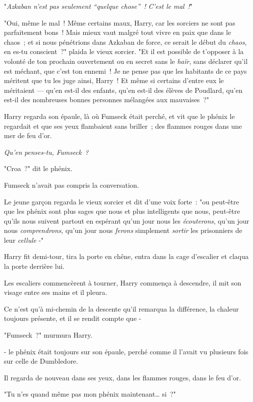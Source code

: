"\emph{Azkaban n'est pas seulement “quelque chose”~! C'est le mal~!}"

"Oui, même le mal~! Même certains maux, Harry, car les sorciers ne sont pas parfaitement bons~! Mais mieux vaut malgré tout vivre en paix que dans le chaos~; et si nous pénétrions dans Azkaban de force, ce serait le début du \emph{chaos}, en es-tu conscient~?" plaida le vieux sorcier. "Et il est possible de t'opposer à la volonté de ton prochain ouvertement ou en secret sans le \emph{haïr}, sans déclarer qu'il est méchant, que c'est ton ennemi~! Je ne pense pas que les habitants de ce pays méritent que tu les juge ainsi, Harry~! Et même si certains d'entre eux le méritaient — qu'en est-il des enfants, qu'en est-il des élèves de Poudlard, qu'en est-il des nombreuses bonnes personnes mélangées aux mauvaises~?"

Harry regarda son épaule, là où Fumseck était perché, et vit que le phénix le regardait et que ses yeux flambaient sans briller~; des flammes rouges dans une mer de feu d'or.

\emph{Qu'en penses-tu, Fumseck~?}

"Croa~?" dit le phénix.

Fumseck n'avait pas compris la conversation.

Le jeune garçon regarda le vieux sorcier et dit d'une voix forte~: "ou peut-être que les phénix sont plus sages que nous et plus intelligents que nous, peut-être qu'ils nous suivent partout en espérant qu'un jour nous les \emph{écouterons}, qu'un jour nous \emph{comprendrons}, qu'un jour nous \emph{ferons} simplement \emph{sortir} les prisonniers de leur \emph{cellule} -"

Harry fit demi-tour, tira la porte en chêne, entra dans la cage d'escalier et claqua la porte derrière lui.

Les escaliers commencèrent à tourner, Harry commença à descendre, il mit son visage entre ses mains et il pleura.

Ce n'est qu'à mi-chemin de la descente qu'il remarqua la différence, la chaleur toujours présente, et il se rendit compte que -

"Fumseck~?" murmura Harry.

- le phénix était toujours sur son épaule, perché comme il l'avait vu plusieurs fois sur celle de Dumbledore.

Il regarda de nouveau dans ses yeux, dans les flammes rouges, dans le feu d'or.

"Tu n'es quand même pas mon phénix maintenant… si~?"

